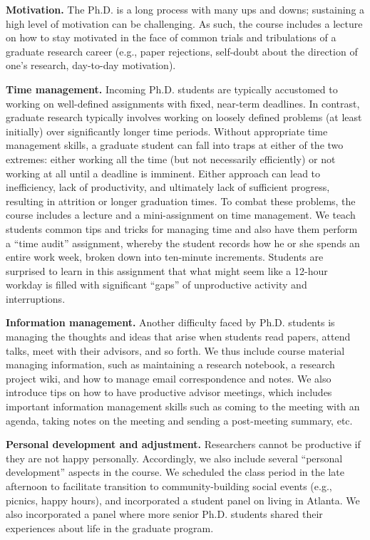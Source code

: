 \vspace*{0.1in}
\noindent
{\bf Motivation.} The Ph.D. is a long process with many ups and
downs; sustaining a high level of motivation can be challenging.  As
such, the course includes a lecture on how to stay motivated in the face
of common trials and tribulations of a graduate research career (e.g.,
paper rejections, self-doubt about the direction of one's research,
day-to-day motivation).

\vspace*{0.1in}
\noindent
{\bf Time management.} Incoming Ph.D. students are typically accustomed
to working on well-defined assignments with fixed, near-term deadlines.
In contrast, graduate research typically involves working on loosely
defined problems (at least initially) over significantly longer time
periods.  Without appropriate time management skills, a graduate student
can fall into traps at either of the two extremes: either working all
the time (but not necessarily efficiently) or not working at all until a
deadline is imminent.  Either approach can lead to inefficiency, lack of
productivity, and ultimately lack of sufficient progress, resulting in
attrition or longer graduation times.   To combat these problems, the
course includes a lecture and a mini-assignment on time management.  We
teach students common tips and tricks for managing time and also have
them perform a ``time audit'' assignment, whereby the student records
how he or she spends an entire work week, broken down into ten-minute
increments.   Students are surprised to learn in this assignment that
what might seem like a 12-hour workday is filled with significant
``gaps'' of unproductive activity and interruptions.   

\vspace*{0.1in}
\noindent
{\bf Information management.}  Another difficulty faced by
Ph.D. students is managing the thoughts and ideas that arise when
students read papers, attend talks, meet with their advisors, and so
forth.  We thus include course material managing information, such as
maintaining a research notebook, a research project wiki, and how to
manage email correspondence and notes.  We also introduce tips on how to
have productive advisor meetings, which includes important information
management skills such as coming to the meeting with an agenda, taking
notes on the meeting and sending a post-meeting summary, etc.

\vspace*{0.1in}
\noindent
{\bf Personal development and adjustment.}  Researchers cannot be
productive if they are not happy personally.  Accordingly, we also
include several ``personal development'' aspects in the course.  We
scheduled the class period in the late afternoon to facilitate
transition to community-building social events (e.g., picnics, happy
hours), and incorporated a student panel on living in Atlanta.  We also
incorporated a panel where more senior Ph.D. students shared their
experiences about life in the graduate program.


